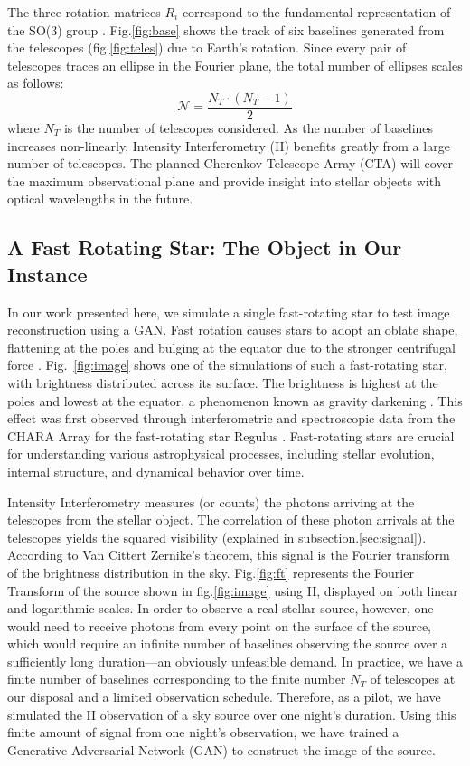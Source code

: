 The three rotation matrices $R_i$ correspond to the fundamental representation of the SO(3) group \cite{saha2020theory}. Fig.\ref{fig:base} shows the track of six baselines generated from the telescopes (fig.\ref{fig:teles}) due to Earth's rotation. Since every pair of telescopes traces an ellipse in the Fourier plane, the total number of ellipses scales as follows: 
\begin{equation}
	\label{eq:N_telescopes}
	\mathcal{N} = \frac{N_T \cdot (N_T -1)}{2}
\end{equation}
where $N_T$ is the number of telescopes considered.
As the number of baselines increases non-linearly, Intensity Interferometry (II) benefits greatly from a large number of telescopes. The planned Cherenkov Telescope Array (CTA) will cover the maximum observational plane and provide insight into stellar objects with optical wavelengths in the future.

\subsection{A Fast Rotating Star: The Object in Our Instance}
In our work presented here, we simulate a single fast-rotating star to test image reconstruction using a GAN. Fast rotation causes stars to adopt an oblate shape, flattening at the poles and bulging at the equator due to the stronger centrifugal force \cite{von1924radiative, 1999A&A...347..185M}. Fig.~\ref{fig:image} shows one of the simulations of such a fast-rotating star, with brightness distributed across its surface. The brightness is highest at the poles and lowest at the equator, a phenomenon known as gravity darkening \cite{lucy1967gravity}. This effect was first observed through interferometric and spectroscopic data from the CHARA Array for the fast-rotating star Regulus \cite{mcalister2005first}. Fast-rotating stars are crucial for understanding various astrophysical processes, including stellar evolution, internal structure, and dynamical behavior over time.

Intensity Interferometry measures (or counts) the photons arriving at the telescopes from the stellar object. The correlation of these photon arrivals at the telescopes yields the squared visibility (explained in subsection.\ref{sec:signal}). According to Van Cittert Zernike's theorem, this signal is the Fourier transform of the brightness distribution in the sky. Fig.\ref{fig:ft} represents the Fourier Transform of the source shown in fig.\ref{fig:image} using II, displayed on both linear and logarithmic scales. In order to observe a real stellar source, however, one would need to receive photons from every point on the surface of the source, which would require an infinite number of baselines observing the source over a sufficiently long duration—an obviously unfeasible demand. In practice, we have a finite number of baselines corresponding to the finite number $N_T$ of telescopes at our disposal and a limited observation schedule. Therefore, as a pilot, we have simulated the II observation of a sky source over one night's duration. Using this finite amount of signal from one night's observation, we have trained a Generative Adversarial Network (GAN) to construct the image of the source.


